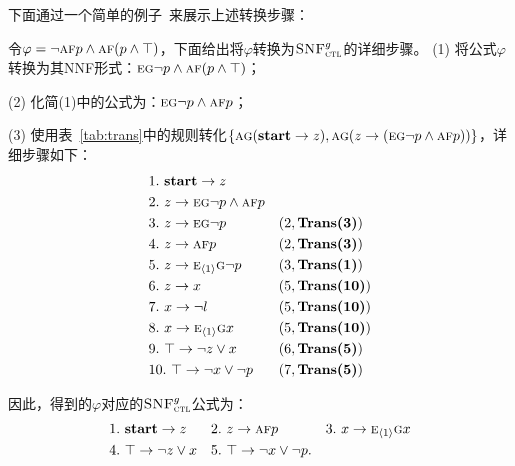 下面通过一个简单的例子~\cite{zhang2014resolution}来展示上述转换步骤：
\begin{example}\label{exmp:transbot}
	令$\varphi=\neg \textsc{a} \textsc{f} p \wedge \textsc{a}\textsc{f}(p \wedge \top)$，下面给出将$\varphi$转换为${\textsc{SNF}_{\textsc{ctl}}^g}$的详细步骤。
	(1) 将公式$\varphi$转换为其NNF形式：$\textsc{e}\textsc{g} \neg p \wedge \textsc{a}\textsc{f}(p \wedge \top)$；
	
	(2) 化简(1)中的公式为：$\textsc{e}\textsc{g} \neg p \wedge \textsc{a}\textsc{f} p$；
	
	(3) 使用表~\ref{tab:trans}中的规则转化$\{\textsc{a}\textsc{g}(\textbf{start} \rightarrow z), \textsc{a}\textsc{g}(z \rightarrow (\textsc{e}\textsc{g} \neg p \wedge \textsc{a}\textsc{f} p))\}$，详细步骤如下：
	\begin{align*}
		&1.\ \textbf{start} \rightarrow z && \\
		&2.\ z \rightarrow \textsc{e}\textsc{g} \neg p \wedge \textsc{a}\textsc{f} p &&  \\
		&3.\ z \rightarrow  \textsc{e}\textsc{g} \neg p && (2, \textbf{Trans(3)})\\
		&4.\ z \rightarrow \textsc{a}\textsc{f} p && (2, \textbf{Trans(3)})\\
		&5.\ z \rightarrow  \textsc{e}_{{\langle{1}\rangle}}\textsc{g} \neg p  && (3, \textbf{Trans(1)})\\
		&6.\ z \rightarrow x && (5, \textbf{Trans(10)})\\
		&7.\ x\rightarrow \neg l && (5, \textbf{Trans(10)})\\
		&8.\ x\rightarrow \textsc{e}_{{\langle{1}\rangle}} \textsc{g} x&& (5, \textbf{Trans(10)})\\
		&9.\ \top \rightarrow \neg z \vee x && (6, \textbf{Trans(5)}) \\
		&10.\ \top \rightarrow \neg x \vee \neg p && (7, \textbf{Trans(5)}) 
	\end{align*}

因此，得到的$\varphi$对应的${\textsc{SNF}_{\textsc{ctl}}^g}$公式为：
\begin{align*}
	&1.\ \textbf{start} \rightarrow z && 2.\ z \rightarrow \textsc{a}\textsc{f} p && 3.\ x\rightarrow \textsc{e}_{{\langle{1}\rangle}} \textsc{g} x\\
	&4.\ \top \rightarrow \neg z \vee x && 5.\ \top \rightarrow \neg x \vee \neg p.
\end{align*}
\end{example}






